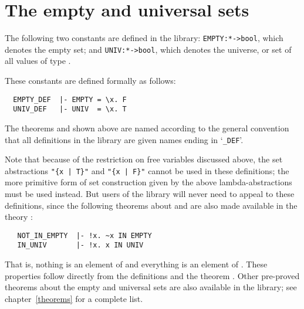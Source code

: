 \section{The empty and universal sets}

The following two constants are defined in the  library:
{\small\verb!EMPTY:*->bool!}, which denotes the empty set; and
{\small\verb!UNIV:*->bool!}, which denotes the universe, or set of all values
of type \ml{*}.{\samepage  These constants are defined formally as follows:

\begin{hol}
\begin{verbatim}
  EMPTY_DEF  |- EMPTY = \x. F
  UNIV_DEF   |- UNIV  = \x. T
\end{verbatim}\end{hol}

\noindent The theorems
 and  shown above are named according
to the general convention that all definitions in the  library
are given names ending
in `{\small\verb!_DEF!}'.}

\pagebreak[3]

Note that because of the restriction on free variables discussed above, the set
abstractions {\small\verb!"{x | T}"!} and {\small\verb!"{x | F}"!} cannot be
used in these definitions; the more primitive form of set construction given by
the above lambda-abstractions must be used instead.  But users of the library
will never need to appeal to these definitions, since the following theorems
about  and  are also made available in the theory
:

\begin{hol}
\begin{verbatim}
   NOT_IN_EMPTY  |- !x. ~x IN EMPTY
   IN_UNIV       |- !x. x IN UNIV
\end{verbatim}\end{hol}

\noindent That is, nothing is an element of  and everything is an
element of . These properties follow directly from the definitions and
the theorem .  Other pre-proved theorems about the empty and
universal sets are also available in the library; see chapter~\ref{theorems}
for a complete list.


